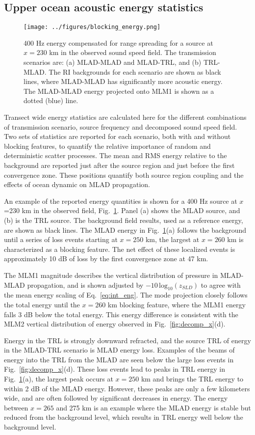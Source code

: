 \documentclass[preprint,NumberedRefs]{JASA}
\begin{document}
\subsection{Upper ocean acoustic energy statistics}\label{ssec:energy}
\begin{figure}
\texttt{[image: ../figures/blocking\_energy.png]}
    \caption{400 Hz energy compensated for range spreading for a source at $x=230$ km in the observed sound speed field. The transmission scenarios are: (a) MLAD-MLAD and MLAD-TRL, and (b) TRL-MLAD. The RI backgrounds for each scenario are shown as black lines, where MLAD-MLAD has significantly more acoustic energy. The MLAD-MLAD energy projected onto MLM1 is shown as a dotted (blue) line.}
    \label{fig:ml_energy}
\end{figure}
Transect wide energy statistics are calculated here for the different combinations of transmission scenario, source frequency and decomposed sound speed field. Two sets of statistics are reported for each scenario, both with and without blocking features, to quantify the relative importance of random and deterministic scatter processes. The mean and RMS energy relative to the background are reported just after the source region and just before the first convergence zone. These positions quantify both source region coupling and the effects of ocean dynamic on MLAD propagation.

An example of the reported energy quantities is shown for a 400 Hz source at $x$=230 km in the observed field, Fig.~\ref{fig:ml_energy}. Panel (a) shows the MLAD source, and (b) is the TRL source. The background field results, used as a reference energy, are shown as black lines. The MLAD energy in Fig.~\ref{fig:ml_energy}(a) follows the background until a series of loss events starting at $x=250$ km, the largest at $x=260$ km is characterized as a blocking feature. The net effect of these localized events is approximately 10 dB of loss by the first convergence zone at 47 km.

The MLM1 magnitude describes the vertical distribution of pressure in MLAD-MLAD propagation, and is shown adjusted by $-10 \, \textrm{log}_{10}(z_{SLD})$ to agree with the mean energy scaling of Eq.~\eqref{eq:int_eng}. The mode projection closely follows the total energy until the $x=260$ km blocking feature, where the MLM1 energy falls 3 dB below the total energy. This energy difference is consistent with the MLM2 vertical distribution of energy observed in Fig.~\ref{fig:decomp_x}(d).

Energy in the TRL is strongly downward refracted, and the source TRL of energy in the MLAD-TRL scenario is MLAD energy loss. Examples of the beams of energy into the TRL from the MLAD are seen below the large loss events in Fig.~\ref{fig:decomp_x}(d). These loss events lead to peaks in TRL energy in Fig.~\ref{fig:ml_energy}(a), the largest peak occurs at $x=250$ km and brings the TRL energy to within 2 dB of the MLAD energy. However, these peaks are only a few kilometers wide, and are often followed by significant decreases in energy. The energy between $x=265$ and 275 km is an example where the MLAD energy is stable but reduced from the background level, which results in TRL energy well below the background level.
\end{document}
